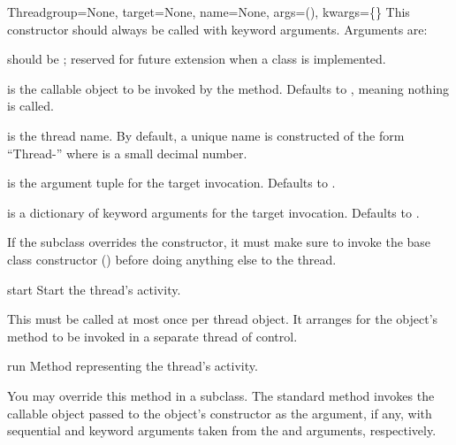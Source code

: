 \begin{classdesc}{Thread}{group=None, target=None, name=None,
                          args=(), kwargs=\{\}}
This constructor should always be called with keyword
arguments.  Arguments are:

 should be ; reserved for future extension when
a  class is implemented.

 is the callable object to be invoked by the
 method.  Defaults to , meaning nothing is
called.

 is the thread name.  By default, a unique name is
constructed of the form ``Thread-'' where  is a small
decimal number.

 is the argument tuple for the target invocation.  Defaults
to \code{()}.

 is a dictionary of keyword arguments for the target
invocation.  Defaults to \code{\{\}}.

If the subclass overrides the constructor, it must make sure
to invoke the base class constructor ()
before doing anything else to the thread.
\end{classdesc}

\begin{methoddesc}{start}{}
Start the thread's activity.

This must be called at most once per thread object.  It
arranges for the object's  method to be invoked in a
separate thread of control.
\end{methoddesc}

\begin{methoddesc}{run}{}
Method representing the thread's activity.

You may override this method in a subclass.  The standard
 method invokes the callable object passed to the
object's constructor as the  argument, if any, with
sequential and keyword arguments taken from the  and
 arguments, respectively.
\end{methoddesc}

